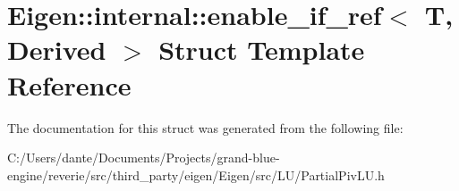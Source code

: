 \hypertarget{struct_eigen_1_1internal_1_1enable__if__ref}{}\section{Eigen\+::internal\+::enable\+\_\+if\+\_\+ref$<$ T, Derived $>$ Struct Template Reference}
\label{struct_eigen_1_1internal_1_1enable__if__ref}


The documentation for this struct was generated from the following file\+:\begin{DoxyCompactItemize}
\item 
C\+:/\+Users/dante/\+Documents/\+Projects/grand-\/blue-\/engine/reverie/src/third\+\_\+party/eigen/\+Eigen/src/\+L\+U/Partial\+Piv\+L\+U.\+h\end{DoxyCompactItemize}
